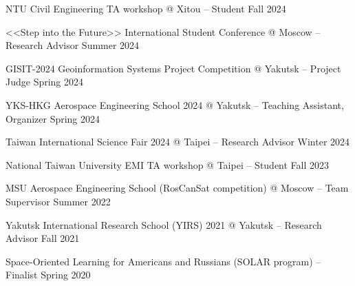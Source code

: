NTU Civil Engineering TA workshop @ Xitou -- Student \hfill Fall 2024

<<Step into the Future>> International Student Conference @ Moscow -- Research Advisor \hfill Summer 2024

GISIT-2024 Geoinformation Systems Project Competition @ Yakutsk -- Project Judge \hfill Spring 2024

YKS-HKG Aerospace Engineering School 2024 @ Yakutsk -- Teaching Assistant, Organizer \hfill Spring 2024

Taiwan International Science Fair 2024 @ Taipei -- Research Advisor \hfill Winter 2024

National Taiwan University EMI TA workshop @ Taipei -- Student \hfill Fall 2023

MSU Aerospace Engineering School (RosCanSat competition) @ Moscow -- Team Supervisor \hfill Summer 2022

Yakutsk International Research School (YIRS) 2021 @ Yakutsk -- Research Advisor  \hfill Fall 2021
 
Space-Oriented Learning for Americans and Russians (SOLAR program) -- Finalist	\hfill Spring 2020

